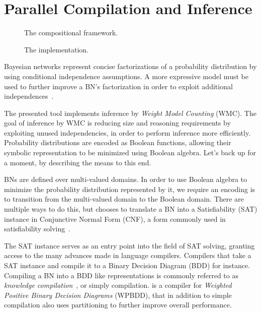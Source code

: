 

\section{Parallel Compilation and Inference}
\label{secjjparallel}

\begin{figure}[!t]
    \centering
    \scalebox{0.6}{
        
    }
    \caption{The compositional framework.}
    \label{fig:frameworkoverview}
\end{figure}

\begin{figure}[!t]
    \centering
    
    \caption{The implementation.}
    \label{fig:implementation}
\end{figure}

Bayesian networks represent concise factorizations of a probability distribution by using conditional independence assumptions. A more expressive model must be used to further improve a BN's factorization in order to exploit additional independences~\cite{zhang1996exploiting,boutilier1996context,friedman1998learning}.

The presented tool implements inference by \emph{Weight Model Counting} (WMC). The goal of inference by WMC is reducing size and reasoning requirements by exploiting unused independencies, in order to perform inference more efficiently. Probability distributions are encoded as Boolean functions, allowing their symbolic representation to be minimized using Boolean algebra. Let's back up for a moment, by describing the means to this end.

BNs are defined over multi-valued domains. In order to use Boolean algebra to minimize the probability distribution represented by it, we require an encoding is to transition from the multi-valued domain to the Boolean domain. There are multiple ways to do this, but \toolname chooses to translate a BN into a Satisfiability (SAT) instance in Conjunctive Normal Form (CNF), a form commonly used in satisfiability solving~\cite{dal2017wpbdd}.

The SAT instance serves as an entry point into the field of SAT solving, granting access to the many advances made in language compilers. Compilers that take a SAT instance and compile it to a Binary Decision Diagram (BDD) for instance. Compiling a BN into a BDD like representations is commonly referred to as \emph{knowledge compilation}~\cite{darwiche2002knowledge}, or simply compilation. \toolname is a compiler for \emph{Weighted Positive Binary Decision Diagrams} (WPBDD), that in addition to simple compilation also uses partitioning to further improve overall performance.

